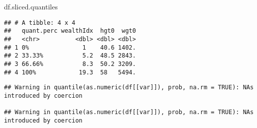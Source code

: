 \documentclass[
]{article}
\newenvironment{Shaded}{\begin{snugshade}}{\end{snugshade}}
\newcommand{\CommentTok}[1]{\textcolor[rgb]{0.56,0.35,0.01}{\textit{#1}}}
\newcommand{\DataTypeTok}[1]{\textcolor[rgb]{0.13,0.29,0.53}{#1}}
\newcommand{\FloatTok}[1]{\textcolor[rgb]{0.00,0.00,0.81}{#1}}
\newcommand{\KeywordTok}[1]{\textcolor[rgb]{0.13,0.29,0.53}{\textbf{#1}}}
\newcommand{\NormalTok}[1]{#1}
\newcommand{\OperatorTok}[1]{\textcolor[rgb]{0.81,0.36,0.00}{\textbf{#1}}}
\newcommand{\StringTok}[1]{\textcolor[rgb]{0.31,0.60,0.02}{#1}}
\begin{document}
\begin{Shaded}
\begin{Highlighting}[]
\NormalTok{df.sliced.quantiles}
\end{Highlighting}
\end{Shaded}

\begin{verbatim}
## # A tibble: 4 x 4
##   quant.perc wealthIdx  hgt0  wgt0
##   <chr>          <dbl> <dbl> <dbl>
## 1 0%               1    40.6 1402.
## 2 33.33%           5.2  48.5 2843.
## 3 66.66%           8.3  50.2 3209.
## 4 100%            19.3  58   5494.
\end{verbatim}

\begin{Shaded}
\end{Shaded}

\begin{verbatim}
## Warning in quantile(as.numeric(df[[var]]), prob, na.rm = TRUE): NAs introduced by coercion

## Warning in quantile(as.numeric(df[[var]]), prob, na.rm = TRUE): NAs introduced by coercion
\end{verbatim}
\end{document}
